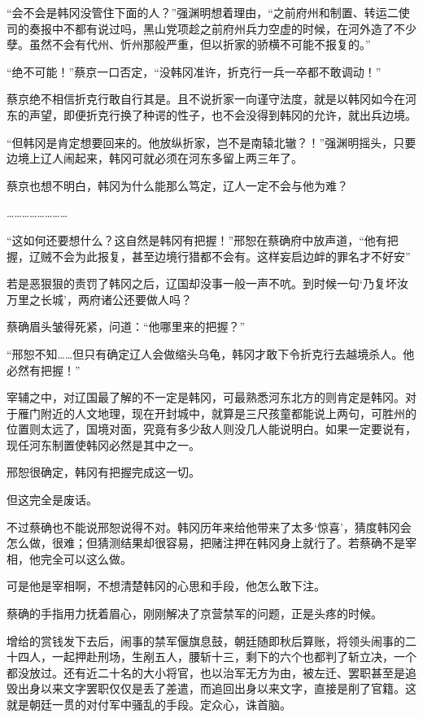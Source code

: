 “会不会是韩冈没管住下面的人？”强渊明想着理由，“之前府州和制置、转运二使司的奏报中不都有说过吗，黑山党项趁之前府州兵力空虚的时候，在河外造了不少孽。虽然不会有代州、忻州那般严重，但以折家的骄横不可能不报复的。”

“绝不可能！”蔡京一口否定，“没韩冈准许，折克行一兵一卒都不敢调动！”

蔡京绝不相信折克行敢自行其是。且不说折家一向谨守法度，就是以韩冈如今在河东的声望，即便折克行换了种谔的性子，也不会没得到韩冈的允许，就出兵边境。

“但韩冈是肯定想要回来的。他放纵折家，岂不是南辕北辙？！”强渊明摇头，只要边境上辽人闹起来，韩冈可就必须在河东多留上两三年了。

蔡京也想不明白，韩冈为什么能那么笃定，辽人一定不会与他为难？

……………………

“这如何还要想什么？这自然是韩冈有把握！”邢恕在蔡确府中放声道，“他有把握，辽贼不会为此报复，甚至边境行猎都不会有。这样妄启边衅的罪名才不好安”

若是恶狠狠的责罚了韩冈之后，辽国却没事一般一声不吭。到时候一句‘乃复坏汝万里之长城’，两府诸公还要做人吗？

蔡确眉头皱得死紧，问道：“他哪里来的把握？”

“邢恕不知……但只有确定辽人会做缩头乌龟，韩冈才敢下令折克行去越境杀人。他必然有把握！”

宰辅之中，对辽国最了解的不一定是韩冈，可最熟悉河东北方的则肯定是韩冈。对于雁门附近的人文地理，现在开封城中，就算是三尺孩童都能说上两句，可胜州的位置则太远了，国境对面，究竟有多少敌人则没几人能说明白。如果一定要说有，现任河东制置使韩冈必然是其中之一。

邢恕很确定，韩冈有把握完成这一切。

但这完全是废话。

不过蔡确也不能说邢恕说得不对。韩冈历年来给他带来了太多‘惊喜’，猜度韩冈会怎么做，很难；但猜测结果却很容易，把赌注押在韩冈身上就行了。若蔡确不是宰相，他完全可以这么做。

可是他是宰相啊，不想清楚韩冈的心思和手段，他怎么敢下注。

蔡确的手指用力抚着眉心，刚刚解决了京营禁军的问题，正是头疼的时候。

增给的赏钱发下去后，闹事的禁军偃旗息鼓，朝廷随即秋后算账，将领头闹事的二十四人，一起押赴刑场，生剐五人，腰斩十三，剩下的六个也都判了斩立决，一个都没放过。还有近二十名的大小将官，也以治军无方为由，被左迁、罢职甚至是追毁出身以来文字罢职仅仅是丢了差遣，而追回出身以来文字，直接是削了官籍。这就是朝廷一贯的对付军中骚乱的手段。定众心，诛首脑。

